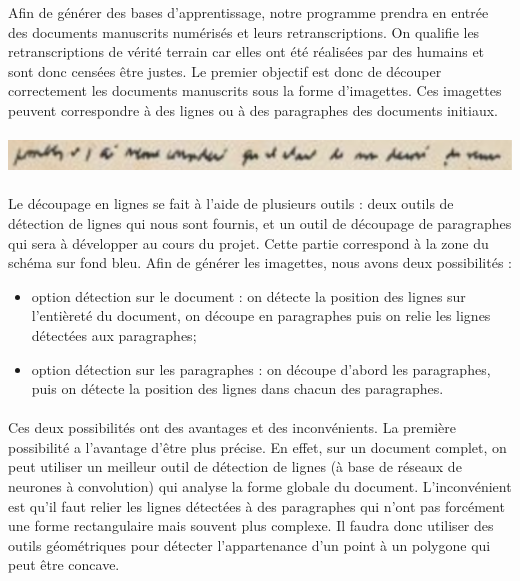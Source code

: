 Afin de générer des bases d’apprentissage, notre programme prendra en entrée des documents manuscrits
numérisés et leurs retranscriptions. On qualifie les retranscriptions de vérité terrain car elles
ont été réalisées par des humains et sont donc censées être justes. Le premier objectif est donc de
découper correctement les documents manuscrits sous la forme d’imagettes. Ces imagettes peuvent
correspondre à des lignes ou à des paragraphes des documents initiaux.

\paragraph{}
\begin{mdframed}[frametitle={Figure 3 : Exemple d'imagette}, innerbottommargin=10]
\begin{center}
\includegraphics[width=\linewidth]{imagette.png}
\end{center}
\end{mdframed}

\paragraph{}
Le découpage en lignes se fait à l’aide de plusieurs outils : deux outils de détection de lignes qui nous sont fournis,
et un outil de découpage de paragraphes qui sera à développer au cours du projet. Cette partie correspond à la zone du
schéma sur fond bleu. Afin de générer les imagettes, nous avons deux possibilités :

\begin{itemize}
\item option détection sur le document : on détecte la position des lignes sur l’entièreté du document,
on découpe en paragraphes puis on relie les lignes détectées aux paragraphes;

\item option détection sur les paragraphes : on découpe d’abord les paragraphes, puis on détecte la position
des lignes dans chacun des paragraphes.
\end{itemize}

\paragraph{}
Ces deux possibilités ont des avantages et des inconvénients. La première possibilité a l’avantage d’être plus précise.
En effet, sur un document complet, on peut utiliser un meilleur outil de détection de lignes (à base de réseaux de
neurones à convolution) qui analyse la forme globale du document. L’inconvénient est qu’il faut relier les lignes
détectées à des paragraphes qui n’ont pas forcément une forme rectangulaire mais souvent plus complexe. Il faudra
donc utiliser des outils géométriques pour détecter l’appartenance d’un point à un polygone qui peut être concave.

